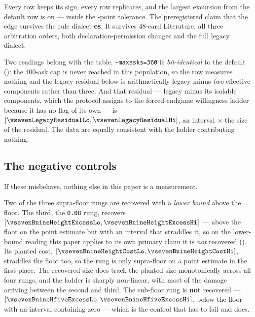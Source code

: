 Every row keeps its sign, every row replicates, and the largest excursion from the default row is
\vsevenDiaMaxExcursion{} on \vsevenDiaMaxExcursionRow{} --- inside the
\vsevenSfiveTolerance{}-point tolerance. The preregistered claim that the edge survives the rule
dialect \textbf{\vsevenSfiveVerdict{}es}. It survives 48-card Literature, all three arbitration
orders, both declaration-permission changes and the full legacy dialect.

Two readings belong with the table. \texttt{--maxasks=360} is \emph{bit-identical} to the default
(\vsevenMaxasksIdentical{}): the 400-ask cap is never reached in this population, so the row measures
nothing and the legacy residual below is arithmetically legacy minus \emph{two} effective components
rather than three. And that residual --- legacy minus its isolable components, which the protocol
assigns to the forced-endgame willingness ladder because it has no flag of its own --- is
\vsevenLegacyResidual{} $[\vsevenLegacyResidualLo, \vsevenLegacyResidualHi]$, an interval
\vsevenLegacyResidualRatio$\times$ the size of the residual. The data are equally consistent with the
ladder contributing nothing.

\subsection{The negative controls}
\label{sec:results-controls}

If these misbehave, nothing else in this paper is a measurement.

\begin{table}[t]\centering
\caption{Planted-edge recovery. The recovered excess is the responder's edge against the handicapped
target minus its edge against the unhandicapped one. The sub-floor rung must \emph{not} be recovered.}
\label{tab:controls}
{\small}
\end{table}

Two of the three supra-floor rungs are recovered with a \emph{lower bound} above the
\vsevenPrimaryFloor{} floor. The third, the \texttt{0.08} rung, recovers \vsevenBnineHeightExcess{}
$[\vsevenBnineHeightExcessLo, \vsevenBnineHeightExcessHi]$ --- above the floor on the point estimate
but with an interval that straddles it, so on the lower-bound reading this paper applies to its own
primary claim it is \emph{not} recovered (\vsevenBnineHeightRecovered{}). Its planted cost,
\vsevenBnineHeightCost{} $[\vsevenBnineHeightCostLo, \vsevenBnineHeightCostHi]$, straddles the floor
too, so the rung is only supra-floor on a point estimate in the first place. The recovered size does
track the planted size monotonically across all four rungs, and the ladder is sharply non-linear,
with most of the damage arriving between the second and third. The sub-floor rung is \textbf{not} recovered ---
\vsevenBnineHfiveExcess{} $[\vsevenBnineHfiveExcessLo, \vsevenBnineHfiveExcessHi]$, below the floor with an
interval containing zero --- which is the control that has to fail and does.

